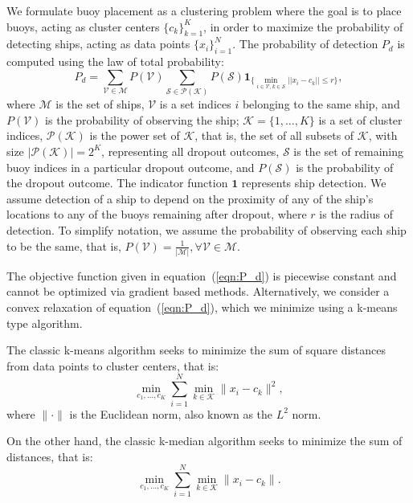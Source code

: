 \documentclass{article}
\begin{document}
We formulate buoy placement as a clustering problem where the goal is to place buoys, acting as cluster centers $\{c_k\}_{k=1}^K$, in order to maximize the probability of detecting ships, acting as data points $\{x_i\}_{i=1}^N$. The probability of detection $P_d$ is computed using the law of total probability:
\begin{equation}
        P_d = \sum_{\mathcal{V}\in\mathcal{M}}P(\mathcal{V})\sum_{\mathcal{S}\in\mathcal{P}(\mathcal{K})}P(\mathcal{S})\mathbf{1}_{\{\min_{i\in\mathcal{V},k\in\mathcal{S}}||x_i-c_k||\leq r\}},
        \label{eqn:P_d}
\end{equation}
where $\mathcal{M}$ is the set of ships, $\mathcal{V}$ is a set indices $i$ belonging to the same ship, and $P(\mathcal{V})$ is the probability of observing the ship; $\mathcal{K}=\{1,\dots,K\}$ is a set of cluster indices, $\mathcal{P}(\mathcal{K})$ is the power set of $\mathcal{K}$, that is, the set of all subsets of $\mathcal{K}$, with size $|\mathcal{P}(\mathcal{K})|=2^K$, representing all dropout outcomes, $\mathcal{S}$ is the set of remaining buoy indices in a particular dropout outcome, and $P(\mathcal{S})$ is the probability of the dropout outcome. The indicator function $\mathbf{1}$ represents ship detection. We assume detection of a ship to depend on the proximity of any of the ship's locations to any of the buoys remaining after dropout, where $r$ is the radius of detection. To simplify notation, we assume the probability of observing each ship to be the same, that is, $P(\mathcal{V})=\frac{1}{|\mathcal{M}|}, \forall \mathcal{V}\in\mathcal{M}$.  

The objective function given in equation~(\ref{eqn:P_d}) is piecewise constant and cannot be optimized via gradient based methods. Alternatively, we consider a convex relaxation of equation~(\ref{eqn:P_d}), which we minimize using a k-means type algorithm.

The classic k-means algorithm seeks to minimize the sum of square distances from data points to cluster centers, that is:
\begin{equation}
    \min_{c_1,\dots,c_K} \sum_{i=1}^N \min_{k\in\mathcal{K}} \|x_i-c_k\|^2,
    \label{eqn:kmeans_obj}
\end{equation}
where $\|\cdot\|$ is the Euclidean norm, also known as the $\mathit{L}^2$ norm.

On the other hand, the classic k-median algorithm seeks to minimize the sum of distances, that is:
\begin{equation}
    \min_{c_1,\dots,c_K} \sum_{i=1}^N \min_{k\in\mathcal{K}} \|x_i-c_k\|.
    \label{eqn:kmeans_obj}
\end{equation}
\end{document}
